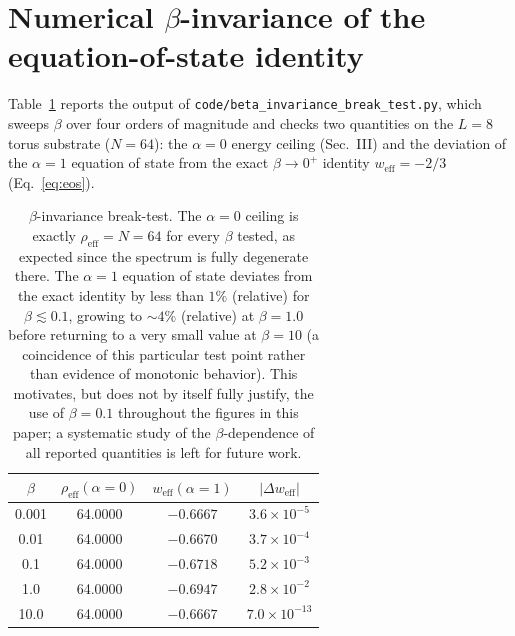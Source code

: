 \documentclass[onecolumn,PRD,amsmath,amssymb,aps,nofootinbib,superscriptaddress,11pt]{revtex4-2}
\begin{document}
\appendix
\section{Numerical $\beta$-invariance of the equation-of-state identity}
\label{app:beta}
Table~\ref{tab:beta} reports the output of \texttt{code/beta\_invariance\_break\_test.py}, which sweeps $\beta$ over four orders of magnitude and checks two quantities on the $L=8$ torus substrate ($N=64$): the $\alpha=0$ energy ceiling (Sec.~III) and the deviation of the $\alpha=1$ equation of state from the exact $\beta\to0^+$ identity $w_{\text{eff}}=-2/3$ (Eq.~\eqref{eq:eos}).

\begin{table}[h]
\centering
\begin{tabular}{cccc}
\hline\hline
$\beta$ & $\rho_{\text{eff}}(\alpha=0)$ & $w_{\text{eff}}(\alpha=1)$ & $|\Delta w_{\text{eff}}|$ \\
\hline
0.001 & 64.0000 & $-0.6667$ & $3.6\times10^{-5}$ \\
0.01  & 64.0000 & $-0.6670$ & $3.7\times10^{-4}$ \\
0.1   & 64.0000 & $-0.6718$ & $5.2\times10^{-3}$ \\
1.0   & 64.0000 & $-0.6947$ & $2.8\times10^{-2}$ \\
10.0  & 64.0000 & $-0.6667$ & $7.0\times10^{-13}$ \\
\hline\hline
\end{tabular}
\caption{$\beta$-invariance break-test. The $\alpha=0$ ceiling is exactly $\rho_{\text{eff}}=N=64$ for every $\beta$ tested, as expected since the spectrum is fully degenerate there. The $\alpha=1$ equation of state deviates from the exact identity by less than $1\%$ (relative) for $\beta\lesssim0.1$, growing to $\sim4\%$ (relative) at $\beta=1.0$ before returning to a very small value at $\beta=10$ (a coincidence of this particular test point rather than evidence of monotonic behavior). This motivates, but does not by itself fully justify, the use of $\beta=0.1$ throughout the figures in this paper; a systematic study of the $\beta$-dependence of all reported quantities is left for future work.}
\label{tab:beta}
\end{table}
\end{document}

